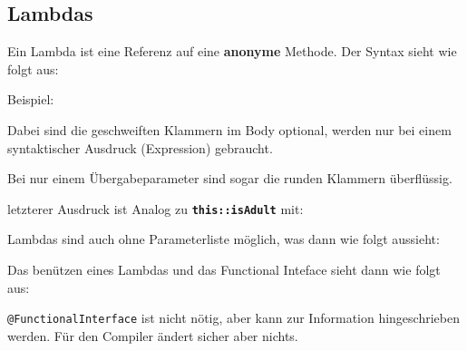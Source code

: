 	\subsection*{Lambdas}
		Ein Lambda ist eine Referenz auf eine \textbf{anonyme} Methode. Der Syntax sieht wie folgt aus:
		
		Beispiel:
		
		Dabei sind die geschweiften Klammern im Body optional, werden nur bei einem syntaktischer Ausdruck (Expression) gebraucht.
		
		Bei nur einem Übergabeparameter sind sogar die runden Klammern überflüssig.
		
		letzterer Ausdruck ist Analog zu \texttt{\textbf{this::isAdult}} mit:
		
		Lambdas sind auch ohne Parameterliste möglich, was dann wie folgt aussieht:
		
		Das benützen eines Lambdas und das Functional Inteface sieht dann wie folgt aus:\\
		\begin{minipage}[t]{11.3cm}
			
		\end{minipage}
		\hspace*{0.5cm}
		\begin{minipage}[t]{7cm}
			
			\texttt{@FunctionalInterface} ist nicht nötig, aber kann zur Information hingeschrieben werden. Für den Compiler ändert sicher aber nichts.
		\end{minipage}